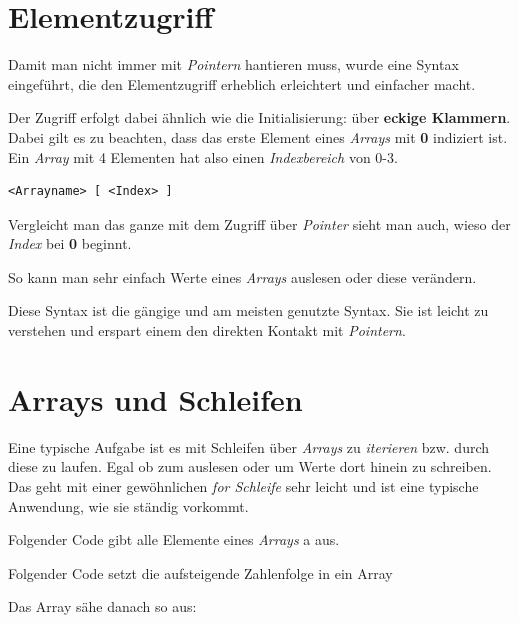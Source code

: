 \documentclass[c_worksheet.tex]{subfiles}
\begin{document}
 

\section{Elementzugriff} 


Damit man nicht immer mit \emph{Pointern} hantieren muss, wurde eine Syntax eingeführt, die den Elementzugriff erheblich erleichtert und einfacher macht.

Der Zugriff erfolgt dabei ähnlich wie die Initialisierung: über \textbf{eckige Klammern}. Dabei gilt es zu beachten, dass das erste Element eines \emph{Arrays} mit \textbf{0} indiziert ist. Ein \emph{Array} mit 4 Elementen hat also einen \emph{Indexbereich} von 0-3.

\begin{lstlisting}
<Arrayname> [ <Index> ]
\end{lstlisting}

Vergleicht man das ganze mit dem Zugriff über \emph{Pointer} sieht man auch, wieso der \emph{Index} bei \textbf{0} beginnt.

 

So kann man sehr einfach Werte eines \emph{Arrays} auslesen oder diese verändern.

Diese Syntax ist die gängige und am meisten genutzte Syntax. Sie ist leicht zu verstehen und erspart einem den direkten Kontakt mit \emph{Pointern}.


\section{Arrays und Schleifen}

Eine typische Aufgabe ist es mit Schleifen über \emph{Arrays} zu \emph{iterieren} bzw. durch diese zu laufen. Egal ob zum auslesen oder um Werte dort hinein zu schreiben. Das geht mit einer gewöhnlichen \emph{for Schleife} sehr leicht und ist eine typische Anwendung, wie sie ständig vorkommt.

Folgender Code gibt alle Elemente eines \emph{Arrays} a aus.

 

Folgender Code setzt die aufsteigende Zahlenfolge in ein Array

 

Das Array sähe danach so aus:
\end{document}
